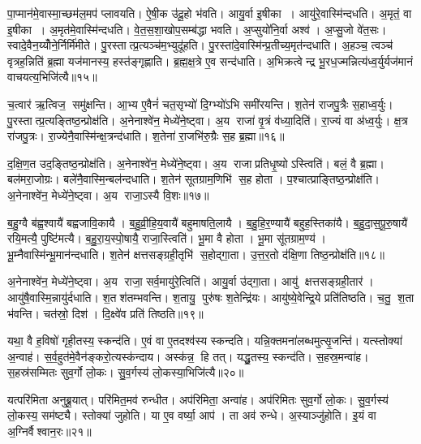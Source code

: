 पा॒प्मान॑मे॒वास्मा॒च्छम॑ल॒मप॑ प्लावयति। ऐ॒षी॒क उ॑दू॒हो भ॑वति। आयु॒र्वा इ॒षीका। आयु॑रे॒वास्मि॑न्दधति। अ॒मृतं॒ वा इ॒षीका। अ॒मृत॑मे॒वास्मि॑न्दधति। वे॒त॒स॒शा॒खोप॒सम्ब॑द्धा भवति। अ॒प्सुयो॑नि॒र्वा अश्व॑। अ॒प्सु॒जो वे॑त॒सः। स्वादे॒वैन॒य्योँने॒र्निर्मि॑मीते। पु॒रस्तात्प्र॒त्यञ्च॑म॒भ्युदू॑हति। पु॒रस्ता॑दे॒वास्मि॑न्प्र॒तीच्य॒मृत॑न्दधाति। अ॒हञ्च॒ त्वञ्च॑ वृत्रह॒न्निति॑ ब्र॒ह्मा यज॑मानस्य॒ हस्त॑ङ्गृह्णाति। ब्र॒ह्म॒क्ष॒त्रे ए॒व सन्द॑धाति। अ॒भिक्रत्वेन्द्र भू॒रध॒ज्मन्नित्य॑ध्व॒र्युर्यज॑मानं वाचयत्य॒भिजि॑त्यै॥१५॥\anuvakamend[भ॒व॒ति॒ प्ला॒व॒य॒ति॒ मि॒मी॒ते॒ पञ्च॑ च]

च॒त्वार॑ ऋ॒त्विज॒ समु॑क्षन्ति। आ॒भ्य ए॒वैनं॑ चत॒सृभ्यो॑ दि॒ग्भ्यो॑ऽभि समी॑रयन्ति। श॒तेन॑ राजपु॒त्रैः स॒हाध्व॒र्युः। पु॒रस्तात्प्र॒त्यङ्तिष्ठ॒न्प्रोक्ष॑ति। अ॒नेनाश्वे॑न॒ मेध्ये॑ने॒ष्ट्वा। अ॒य राजा॑ वृ॒त्रं व॑ध्या॒दिति॑। रा॒ज्यं वा अ॑ध्व॒र्युः। क्ष॒त्र रा॑जपु॒त्रः। रा॒ज्येनै॒वास्मि॑न्क्ष॒त्रन्द॑धाति। श॒तेना॑ रा॒जभि॑रु॒ग्रैः स॒ह ब्र॒ह्मा॥१६॥

द॒क्षि॒ण॒त उद॒ङ्तिष्ठ॒न्प्रोक्ष॑ति। अ॒नेनाश्वे॑न॒ मेध्ये॑ने॒ष्ट्वा। अ॒य राजाप्रतिधृ॒ष्योऽस्त्विति॑। बलं॒ वै ब्र॒ह्मा। बल॑मरा॒जोग्रः। बले॑नै॒वास्मि॒न्बल॑न्दधाति। श॒तेन॑ सूतग्राम॒णिभि॑ स॒ह होता। प॒श्चात्प्राङ्तिष्ठ॒न्प्रोक्ष॑ति। अ॒नेनाश्वे॑न॒ मेध्ये॑ने॒ष्ट्वा। अ॒य राजा॒ऽस्यै वि॒शः॥१७॥

ब॒हु॒ग्वै ब॑ह्व॒श्वायै॑ बह्वजावि॒कायै। ब॒हु॒व्री॒हि॒य॒वायै॑ बहुमाषति॒लायै। ब॒हु॒हि॒र॒ण्यायै॑ बहुह॒स्तिका॑यै। ब॒हु॒दा॒स॒पू॒रु॒षायै॑ रयि॒मत्यै॒ पुष्टि॑मत्यै। ब॒हु॒रा॒य॒स्पो॒षायै॒ राजा॒स्त्विति॑। भू॒मा वै होता। भू॒मा सू॑तग्राम॒ण्य॑। भू॒म्नैवास्मि॑न्भू॒मान॑न्दधाति। श॒तेन॑ क्षत्तसङ्ग्रही॒तृभि॑ स॒होद्गा॒ता। उ॒त्त॒र॒तो द॑क्षि॒णा तिष्ठ॒न्प्रोक्ष॑ति॥१८॥

अ॒नेनाश्वे॑न॒ मेध्ये॑ने॒ष्ट्वा। अ॒य राजा॒ सर्व॒मायु॑रे॒त्विति॑। आयु॒र्वा उ॑द्गा॒ता। आयु॑ क्षत्तसङ्ग्रही॒तार॑। आयु॑षै॒वास्मि॒न्नायु॑र्दधाति। श॒तश॑तम्भवन्ति। श॒तायु॒ पुरु॑षः श॒तेन्द्रि॑यः। आयु॑ष्ये॒वेन्द्रि॒ये प्रति॑तिष्ठति। च॒तु॒ श॒ता भ॑वन्ति। चत॑स्रो॒ दिश॑। दि॒क्ष्वे॑व प्रति॑ तिष्ठति॥१९॥\anuvakamend[ब्र॒ह्मा वि॒श उ॑क्षति॒ दिश॒ एकं च]

यथा॒ वै ह॒विषो॑ गृही॒तस्य॒ स्कन्द॑ति। ए॒वं वा ए॒तदश्व॑स्य स्कन्दति। यन्नि॒क्तमना॑लब्धमुत्सृ॒जन्ति॑। यत्स्तोक्या॑ अ॒न्वाह॑। स॒र्व॒हुत॑मे॒वैन॑ङ्करो॒त्यस्क॑न्दाय। अस्क॑न्न॒ हि तत्। यद्धु॒तस्य॒ स्कन्द॑ति। स॒हस्र॒मन्वा॑ह। स॒हस्र॑सम्मितः सुव॒र्गो लो॒कः। सु॒व॒र्गस्य॑ लो॒कस्या॒भिजि॑त्यै॥२०॥

यत्परि॑मिता अनुब्रू॒यात्। परि॑मित॒मव॑ रुन्धीत। अप॑रिमिता॒ अन्वा॑ह। अप॑रिमितः सुव॒र्गो लो॒कः। सु॒व॒र्गस्य॑ लो॒कस्य॒ सम॑ष्ट्यै। स्तोक्या॑ जुहोति। या ए॒व वर्ष्या॒ आप॑। ता अव॑ रुन्धे। अ॒स्याञ्जु॑होति। इ॒यं वा अ॒ग्निर्वैश्वान॒रः॥२१॥

